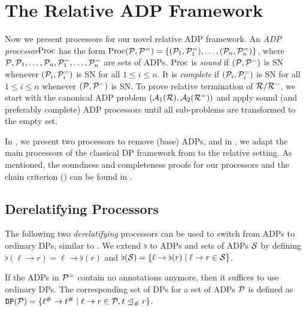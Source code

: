 \section{The Relative ADP Framework}\label{Relative ADP Processors}

Now we present processors for our novel
relative ADP framework.
An \emph{ADP processor}\linebreak $\operatorname{Proc}$ has the form
$\operatorname{Proc}(\mathcal{P},\mathcal{P}^{=}) = \{(\mathcal{P}_1,\mathcal{P}^{=}_1), \ldots,
(\mathcal{P}_n,\mathcal{P}^{=}_n)\}$,  
where $\C{P}, \C{P}_1, \ldots, \C{P}_n,\linebreak \C{P}_1^{=}, \ldots, \C{P}_n^{=}$ are sets of ADPs. 
 $\operatorname{Proc}$ is \emph{sound} if $(\mathcal{P},\mathcal{P}^{=})$ is SN whenever 
$(\mathcal{P}_i,\mathcal{P}^{=}_i)$ is SN for all $1 \leq i \leq n$. 
It is \emph{complete} if
$(\mathcal{P}_i,\mathcal{P}^{=}_i)$ is SN for all 
$1 \leq i \leq n$ whenever $(\mathcal{P},\mathcal{P}^{=})$ is SN.
To prove relative termination of $\mathcal{R}/\mathcal{R}^=$, we start with the canonical ADP problem $(\mathcal{A}_{1}(\mathcal{R}),\mathcal{A}_{2}(\mathcal{R}^{=}))$
and apply sound 
(and preferably complete) ADP processors until all sub-problems are  transformed to the empty set.

In , we
present two processors to remove (base) ADPs, and
in , we adapt the main processors of the classical DP framework from 
to the relative setting.
As mentioned,  the soundness and completeness proofs for our processors and the chain criterion ()
can be found in .

\subsection{Derelatifying Processors}\label{Derelatifying Processors}

The following two \emph{derelatifying} processors can be used to switch from ADPs to ordinary DPs,
similar to .
We extend $\flat$ to ADPs and sets of ADPs $\mathcal{S}$
by defining $\flat(\ell  \to r) = \ell \to \flat(r)$
and $\flat(\mathcal{S}) = \{\ell  \to \flat(r) \mid \ell \to r \in \mathcal{S}\}$.

If the ADPs in $\mathcal{P}^{=}$ contain no annotations anymore,
then it suffices to use ordinary DPs.
The corresponding set of DPs for a set of ADPs $\mathcal{P}$ is defined as 
$\mathtt{DP}(\mathcal{P}) = \{\ell^\# \to t^\# \mid \ell \to r \in \mathcal{P}, t \trianglelefteq_{\#} r\}$.

